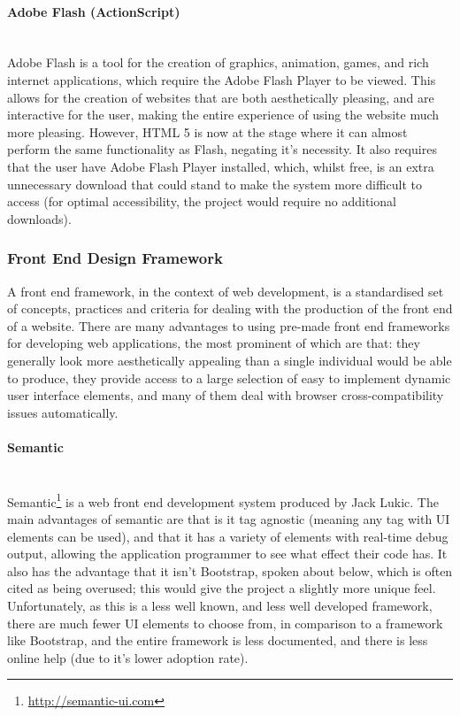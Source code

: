 \paragraph{Adobe Flash (ActionScript)}\ \\
Adobe Flash is a tool for the creation of graphics, animation, games, and rich internet applications, which require the Adobe Flash Player to be viewed. This allows for the creation of websites that are both aesthetically pleasing, and are interactive for the user, making the entire experience of using the website much more pleasing. However, HTML 5 is now at the stage where it can almost perform the same functionality as Flash, negating it's necessity. It also requires that the user have Adobe Flash Player installed, which, whilst free, is an extra unnecessary download that could stand to make the system more difficult to access (for optimal accessibility, the project would require no additional downloads).

\subsubsection{Front End Design Framework}
A front end framework, in the context of web development, is a standardised set of concepts, practices and criteria for dealing with the production of the front end of a website. There are many advantages to using pre-made front end frameworks for developing web applications, the most prominent of which are that: they generally look more aesthetically appealing than a single individual would be able to produce, they provide access to a large selection of easy to implement dynamic user interface elements, and many of them deal with browser cross-compatibility issues automatically. 

\paragraph{Semantic}\ \\
Semantic\footnote{\url{http://semantic-ui.com}} is a web front end development system produced by Jack Lukic. The main advantages of semantic are that is it tag agnostic (meaning any tag with UI elements can be used), and that it has a variety of elements with real-time debug output, allowing the application programmer to see what effect their code has. It also has the advantage that it isn't Bootstrap, spoken about below, which is often cited as being overused; this would give the project a slightly more unique feel. Unfortunately, as this is a less well known, and less well developed framework, there are much fewer UI elements to choose from, in comparison to a framework like Bootstrap, and the entire framework is less documented, and there is less online help (due to it's lower adoption rate).

